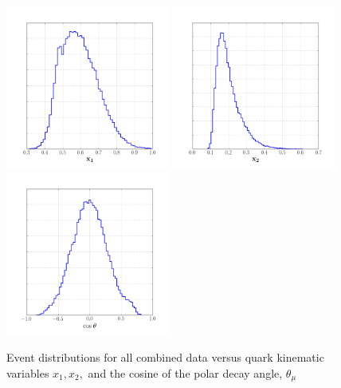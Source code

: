 \begin{figure}
	\centering
	\includegraphics[width=0.48\textwidth]{figures/results/x1-dist.png} \hfill
	\includegraphics[width=0.48\textwidth]{figures/results/x2-dist.png} \\
	\includegraphics[width=0.48\textwidth]{figures/results/costh-dist.png}
	\caption{Event distributions for all combined data versus quark kinematic variables $x_1, x_2,$ and the cosine of the polar decay angle, $\theta_\mu$}
	\label{fig:event-dist2}
\end{figure}

